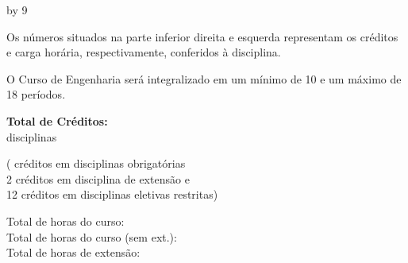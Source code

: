 \documentclass[a4paper, landscape]{article}
\newcounter{cred}
\newcounter{thoras}
\newcounter{tdisciplinas}
\begin{document}
\addtocounter{thoras}{-30}
\setcounter{haula}{\the\value{thoras}}
\setcounter{hextensao}{\the\value{thoras}}
\divide\value{hextensao} by 9
\addtocounter{thoras}{\the\value{hextensao}}
\addtocounter{hextensao}{1} %

\vspace{-4mm}
\setlength\parindent{0pt}

\begin{multicols}{4}
  \vfill
  Os números situados na parte inferior direita e esquerda representam os créditos e carga horária, respectivamente, conferidos à disciplina.


  \columnbreak
  O Curso de Engenharia será integralizado em um mínimo de 10 e um máximo de 18 períodos.

  \columnbreak
  \textbf{Total de Créditos:} \the\value{cred}\\
  \the\value{tdisciplinas} disciplinas\\
  \addtocounter{cred}{-14}
  (\the\value{cred} créditos em disciplinas obrigatórias\\ 2 créditos em disciplina de extensão e\\ 12 créditos em disciplinas eletivas restritas)

  \columnbreak
  \addtocounter{thoras}{1} %
  Total de horas do curso: \the\value{thoras}\\
  Total de horas do curso (sem ext.): \the\value{haula}\\
  Total de horas de extensão: \the\value{hextensao}


\end{multicols}
\end{document}
